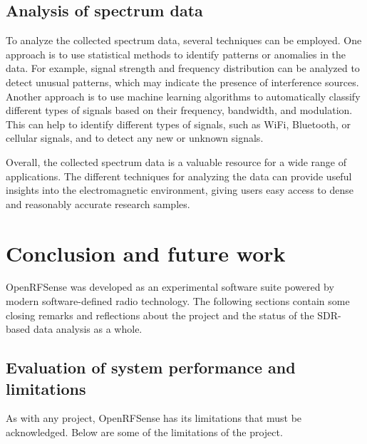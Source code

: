 \documentclass[
  letterpaper,
  a4paper,
  12pt,
  titlepage,
  oneside,
  openany]{book}
\begin{document}
\hypertarget{analysis-of-spectrum-data}{%
\section{Analysis of spectrum data}\label{analysis-of-spectrum-data}}

To analyze the collected spectrum data, several techniques can be
employed. One approach is to use statistical methods to identify
patterns or anomalies in the data. For example, signal strength and
frequency distribution can be analyzed to detect unusual patterns, which
may indicate the presence of interference sources. Another approach is
to use machine learning algorithms to automatically classify different
types of signals based on their frequency, bandwidth, and modulation.
This can help to identify different types of signals, such as WiFi,
Bluetooth, or cellular signals, and to detect any new or unknown
signals.

Overall, the collected spectrum data is a valuable resource for a wide
range of applications. The different techniques for analyzing the data
can provide useful insights into the electromagnetic environment, giving
users easy access to dense and reasonably accurate research samples.


\hypertarget{conclusion-and-future-work}{%
\chapter{Conclusion and future work}\label{conclusion-and-future-work}}

OpenRFSense was developed as an experimental software suite powered by
modern software-defined radio technology. The following sections contain
some closing remarks and reflections about the project and the status of
the SDR-based data analysis as a whole.

\hypertarget{evaluation-of-system-performance-and-limitations}{%
\section{Evaluation of system performance and
limitations}\label{evaluation-of-system-performance-and-limitations}}

As with any project, OpenRFSense has its limitations that must be
acknowledged. Below are some of the limitations of the project.
\end{document}
